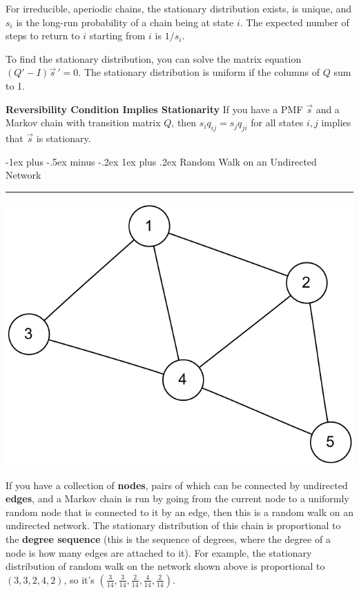 \documentclass[letterpaper, 10.5pt,landscape]{article}
\makeatletter
\renewcommand{\subsubsection}{\@startsection{subsubsection}{3}{0mm}%
                                {-1ex plus -.5ex minus -.2ex}%
                                {1ex plus .2ex}%
                                {\normalfont\small\bfseries}}
\makeatother
\begin{document}
\begin{multicols*}{3}
For irreducible, aperiodic chains, the stationary distribution exists, is unique, and $s_i$ is the long-run probability of a chain being at state $i$. The expected number of steps to return to $i$ starting from $i$ is $1/s_i$.

\smallskip

 To find the stationary distribution, you can solve the matrix equation $(Q' - I){\vec{s}\,}'= 0$. The stationary distribution is uniform if the columns of $Q$ sum to 1.



\textbf{Reversibility Condition Implies Stationarity}  If you have a PMF $\vec{s}$ and a Markov chain with transition matrix $Q$, then $s_iq_{ij} = s_jq_{ji}$ for all states $i, j$ implies that $\vec{s}$ is stationary.





\subsubsection{Random Walk on an Undirected Network}{\color{teal}\hrule height 0.5pt} \smallskip


\begin{center}
    \begin{minipage}{0.5\linewidth}
    \includegraphics[width=\textwidth]{figures/network1.pdf}
    \end{minipage}
\end{center}




If you have a collection of \textbf{nodes}, pairs of which can be connected by undirected \textbf{edges}, and a Markov chain is run by going from the current node to a uniformly random node that is connected to it by an edge, then  this is a random walk on an undirected network. The stationary distribution of this chain is proportional to the \textbf{degree sequence} (this is the sequence of degrees, where the degree of a node is how many edges are attached to it). For example, the stationary distribution of random walk on the network shown above is proportional to $(3,3,2,4,2)$, so it's $(\frac{3}{14}, \frac{3}{14}, \frac{2}{14}, \frac{4}{14}, \frac{2}{14})$. 


\end{multicols*}
\end{document}
